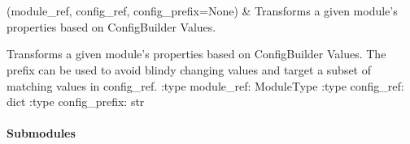 \documentclass[letterpaper,10pt,english]{sphinxmanual}
\begin{document}
\begin{savenotes}\sphinxatlongtablestart\begin{longtable}[c]{}
\hline

\endfirsthead

%
{}\\
\hline

\endhead

\hline
{}\\
\endfoot

\endlastfoot

\sphinxAtStartPar
{\hyperref[\detokenize{autoapi/pine/pipelines/shared/transform/index:pine.pipelines.shared.transform.transform_module_by_config}]{}}(module\_ref, config\_ref, config\_prefix=None)
&
\sphinxAtStartPar
Transforms a given module’s properties based on ConfigBuilder Values.
\\
\hline
\end{longtable}\sphinxatlongtableend\end{savenotes}

\begin{fulllineitems}
\label{\detokenize{autoapi/pine/pipelines/shared/transform/index:pine.pipelines.shared.transform.transform_module_by_config}}
\sphinxAtStartPar
Transforms a given module’s properties based on ConfigBuilder Values.
The prefix can be used to avoid blindy changing values and target a subset of matching values in config\_ref.
:type module\_ref: ModuleType
:type config\_ref: dict
:type config\_prefix: str

\end{fulllineitems}



\paragraph{Submodules}
\label{\detokenize{autoapi/pine/pipelines/index:submodules}}
\end{document}
